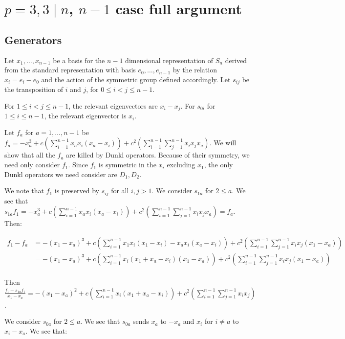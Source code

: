 \documentclass{article}
\numberwithin{equation}{section}
\begin{document}
\section{$p=3, 3 \mid n$, $n-1$ case full argument}

\subsection{Generators}

Let $x_1,\dots,x_{n-1}$ be a basis for the $n-1$ dimensional representation of $S_n$ derived from the standard representation with basis $e_0,\dots,e_{n-1}$ by the relation $x_i=e_i-e_0$ and the action of the symmetric group defined accordingly. Let $s_{ij}$ be the transposition of $i$ and $j$, for $0 \le i < j \le n-1$. 

For $1 \le i < j \le n-1$, the relevant eigenvectors are $x_i-x_j$. For $s_{0i}$ for $1 \le i \le n-1$, the relevant eigenvector is $x_i$. 

Let $f_a$ for $a=1,\dots, n-1$ be $f_a = -x_a^3+c \left(\sum_{i=1}^{n-1} x_ax_i(x_a-x_i)\right)+c^2 \left(\sum_{i=1}^{n-1} \sum_{j=1}^{n-1} x_ix_jx_a\right)$. We will show that all the $f_a$ are killed by Dunkl operators. Because of their symmetry, we need only consider $f_1$. Since $f_1$ is symmetric in the $x_i$ excluding $x_1$, the only Dunkl operators we need consider are $D_1,D_2$.

We note that $f_1$ is preserved by $s_{ij}$ for all $i,j >1$. We consider $s_{1a}$ for $2 \le a$. We see that $s_{1a}f_1=-x_a^3+c \left(\sum_{i=1}^{n-1} x_ax_i(x_a-x_i)\right)+c^2 \left(\sum_{i=1}^{n-1} \sum_{j=1}^{n-1} x_ix_jx_a\right)=f_a$. Then:

\begin{align*}
f_1-f_a&=-(x_1-x_a)^3+c \left(\sum_{i=1}^{n-1} x_1x_i(x_1-x_i)-x_ax_i(x_a-x_i)\right)+c^2 \left(\sum_{i=1}^{n-1} \sum_{j=1}^{n-1} x_ix_j(x_1-x_a)\right)\\
&=-(x_1-x_a)^3+c \left(\sum_{i=1}^{n-1} x_i(x_1+x_a-x_i)(x_1-x_a)\right)+c^2 \left(\sum_{i=1}^{n-1} \sum_{j=1}^{n-1} x_ix_j(x_1-x_a)\right)\\
\end{align*}

Then $\frac{f_1-s_{1a}f_1}{x_1-x_a}=-(x_1-x_a)^2+c \left(\sum_{i=1}^{n-1} x_i(x_1+x_a-x_i)\right)+c^2 \left(\sum_{i=1}^{n-1} \sum_{j=1}^{n-1} x_ix_j\right)$.

We consider $s_{0a}$ for $2 \le a$. We see that $s_{0a}$ sends $x_a$ to $-x_a$ and $x_i$ for $i \ne a$ to $x_i-x_a$. We see that: 
\end{document}
